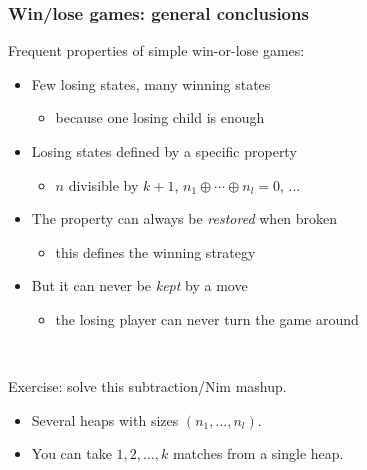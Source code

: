 \documentclass[12pt]{beamer}
\begin{document}
\begin{frame}
\frametitle{Win/lose games: general conclusions}
Frequent properties of simple win-or-lose games:
\begin{itemize}
\item Few losing states, many winning states
\begin{itemize} \item because one losing child is enough \end{itemize}
\item Losing states defined by a specific property
\begin{itemize} \item $n$ divisible by $k+1$, $n_1 \oplus \cdots \oplus n_l = 0$, ... \end{itemize}
\item The property can always be \emph{restored} when broken
\begin{itemize} \item this defines the winning strategy \end{itemize}
\item But it can never be \emph{kept} by a move
\begin{itemize} \item the losing player can never turn the game around \end{itemize}
\end{itemize}

~

Exercise: solve this subtraction/Nim mashup.
\begin{itemize}
\item Several heaps with sizes $(n_1,\ldots,n_l)$.
\item You can take $1,2,\ldots,k$ matches from a single heap.
\end{itemize}
\end{frame}
\end{document}
